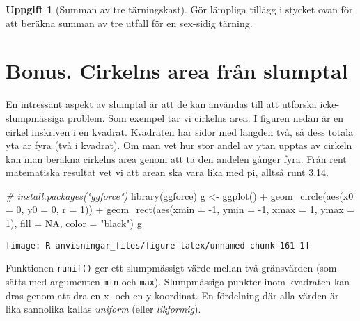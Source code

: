 \documentclass[
]{book}
\newenvironment{Shaded}{\begin{snugshade}}{\end{snugshade}}
\newcommand{\AttributeTok}[1]{\textcolor[rgb]{0.77,0.63,0.00}{#1}}
\newcommand{\CommentTok}[1]{\textcolor[rgb]{0.56,0.35,0.01}{\textit{#1}}}
\newcommand{\ConstantTok}[1]{\textcolor[rgb]{0.00,0.00,0.00}{#1}}
\newcommand{\DecValTok}[1]{\textcolor[rgb]{0.00,0.00,0.81}{#1}}
\newcommand{\FunctionTok}[1]{\textcolor[rgb]{0.00,0.00,0.00}{#1}}
\newcommand{\NormalTok}[1]{#1}
\newcommand{\OtherTok}[1]{\textcolor[rgb]{0.56,0.35,0.01}{#1}}
\newcommand{\SpecialCharTok}[1]{\textcolor[rgb]{0.00,0.00,0.00}{#1}}
\newcommand{\StringTok}[1]{\textcolor[rgb]{0.31,0.60,0.02}{#1}}
\theoremstyle{definition}
\theoremstyle{definition}
\theoremstyle{definition}
\newtheorem{exercise}{Uppgift}[chapter]
\theoremstyle{definition}
\theoremstyle{remark}
\begin{document}
\begin{exercise}[Summan av tre tärningskast]
Gör lämpliga tillägg i stycket ovan för att beräkna summan av tre utfall för en sex-sidig tärning.
\end{exercise}

\hypertarget{bonus.-cirkelns-area-fruxe5n-slumptal}{%
\section{Bonus. Cirkelns area från slumptal}\label{bonus.-cirkelns-area-fruxe5n-slumptal}}

En intressant aspekt av slumptal är att de kan användas till att utforska icke-slumpmässiga problem. Som exempel tar vi cirkelns area. I figuren nedan är en cirkel inskriven i en kvadrat. Kvadraten har sidor med längden två, så dess totala yta är fyra (två i kvadrat). Om man vet hur stor andel av ytan upptas av cirkeln kan man beräkna cirkelns area genom att ta den andelen gånger fyra. Från rent matematiska resultat vet vi att arean ska vara lika med pi, alltså runt 3.14.

\begin{Shaded}
\begin{Highlighting}[]
\CommentTok{\# install.packages("ggforce")}
\FunctionTok{library}\NormalTok{(ggforce)}
\NormalTok{g }\OtherTok{\textless{}{-}} \FunctionTok{ggplot}\NormalTok{() }\SpecialCharTok{+} 
  \FunctionTok{geom\_circle}\NormalTok{(}\FunctionTok{aes}\NormalTok{(}\AttributeTok{x0 =} \DecValTok{0}\NormalTok{, }\AttributeTok{y0 =} \DecValTok{0}\NormalTok{, }\AttributeTok{r =} \DecValTok{1}\NormalTok{)) }\SpecialCharTok{+} 
  \FunctionTok{geom\_rect}\NormalTok{(}\FunctionTok{aes}\NormalTok{(}\AttributeTok{xmin =} \SpecialCharTok{{-}}\DecValTok{1}\NormalTok{, }\AttributeTok{ymin =} \SpecialCharTok{{-}}\DecValTok{1}\NormalTok{, }\AttributeTok{xmax =} \DecValTok{1}\NormalTok{, }\AttributeTok{ymax =} \DecValTok{1}\NormalTok{), }\AttributeTok{fill =} \ConstantTok{NA}\NormalTok{, }\AttributeTok{color =} \StringTok{"black"}\NormalTok{)}
\NormalTok{g}
\end{Highlighting}
\end{Shaded}

\begin{center}\texttt{[image: R-anvisningar\_files/figure-latex/unnamed-chunk-161-1]} \end{center}

Funktionen \texttt{runif()} ger ett slumpmässigt värde mellan två gränsvärden (som sätts med argumenten \texttt{min} och \texttt{max}). Slumpmässiga punkter inom kvadraten kan dras genom att dra en x- och en y-koordinat. En fördelning där alla värden är lika sannolika kallas \emph{uniform} (eller \emph{likformig}).
\end{document}
